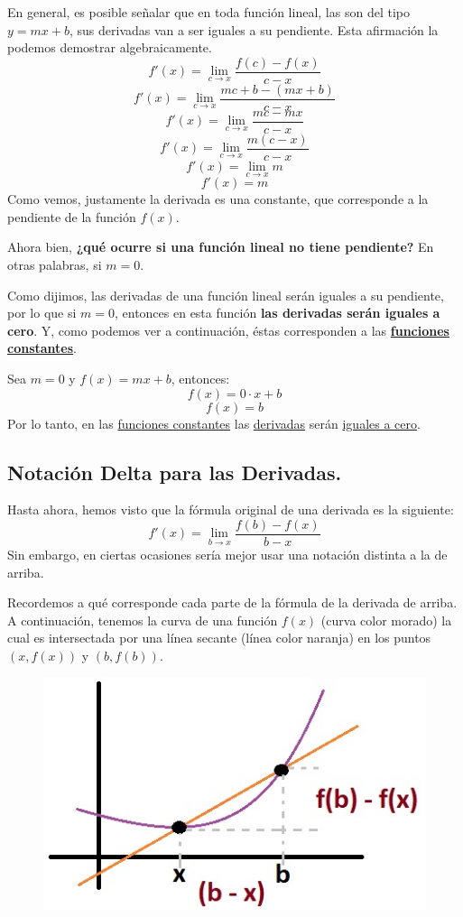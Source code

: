 \documentclass[12pt]{article}
\begin{document}
En general, es posible señalar que en toda función lineal, las son del tipo $y = mx + b$, sus derivadas van a ser iguales a su pendiente. Esta afirmación la podemos demostrar algebraicamente.
\[f'(x) = \lim_{c \to x} \frac{f(c)-f(x)}{c-x}\]
\[f'(x) = \lim_{c \to x} \frac{mc+b-(mx+b)}{c-x}\]
\[f'(x) = \lim_{c \to x} \frac{mc-mx}{c-x}\]
\[f'(x) = \lim_{c \to x} \frac{m(c-x)}{c-x}\]
\[f'(x) = \lim_{c \to x} m\]
\[f'(x) = m\]
Como vemos, justamente la derivada es una constante, que corresponde a la pendiente de la función $f(x)$.

Ahora bien, \textbf{¿qué ocurre si una función lineal no tiene pendiente?} En otras palabras, si $m = 0$.

Como dijimos, las derivadas de una función lineal serán iguales a su pendiente, por lo que si $m = 0$, entonces en esta función \textbf{las derivadas serán iguales a cero}. Y, como podemos ver a continuación, éstas corresponden a las \textbf{\underline{funciones constantes}}.

Sea $m = 0$ y $f(x) = mx + b$, entonces:
\[f(x) = 0 \cdot x + b\]
\[f(x) = b\]
Por lo tanto, en las \underline{funciones constantes} las \underline{derivadas} serán \underline{iguales a cero}.

\newpage

\subsection{Notación Delta para las Derivadas.}

Hasta ahora, hemos visto que la fórmula original de una derivada es la siguiente:
\[f'(x) = \lim_{b \to x} \frac{f(b)-f(x)}{b-x}\]
Sin embargo, en ciertas ocasiones sería mejor usar una notación distinta a la de arriba.

Recordemos a qué corresponde cada parte de la fórmula de la derivada de arriba. A continuación, tenemos la curva de una función $f(x)$ (curva color morado) la cual es intersectada por una línea secante (línea color naranja) en los puntos $(x, f(x))$ y $(b, f(b))$.

\begin{figure}[hbt!]
\centering
\includegraphics[scale=0.6]{img/deriv_delta_explan.jpg}
\end{figure}
\end{document}

